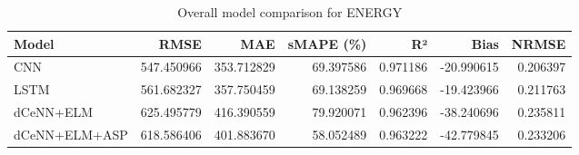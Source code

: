 \begin{table}
\caption{Overall model comparison for ENERGY}
\begin{tabular}{lrrrrrr}
\toprule
Model & RMSE & MAE & sMAPE (\%) & R² & Bias & NRMSE \\
\midrule
CNN & 547.450966 & 353.712829 & 69.397586 & 0.971186 & -20.990615 & 0.206397 \\
LSTM & 561.682327 & 357.750459 & 69.138259 & 0.969668 & -19.423966 & 0.211763 \\
dCeNN+ELM & 625.495779 & 416.390559 & 79.920071 & 0.962396 & -38.240696 & 0.235811 \\
dCeNN+ELM+ASP & 618.586406 & 401.883670 & 58.052489 & 0.963222 & -42.779845 & 0.233206 \\
\bottomrule
\end{tabular}
\end{table}
